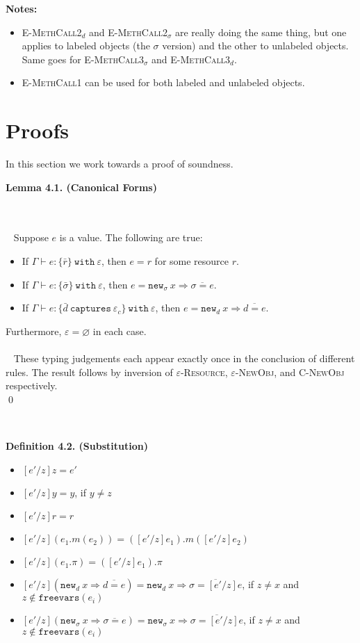 \documentclass{llncs}
\newcommand{\keywadj}[1]{\mathtt{#1}}
\newcommand{\keyw}[1]{\keywadj{#1}~}
\newcommand{\thm}[3]{
	\begin{large}
		\bf{#1}
	\end{large} \\\\
	\fbox{Statement.} ~ #2
	\fbox{Proof.}~ #3 \qed
}
\newcommand{\type}[2]{
	#1~\keyw{with} #2
}
\newcommand{\newd}[0]{
	\keywadj{new}_d~x \Rightarrow \overline{d = e}
}
\newcommand{\newsig}[0]{
	\keywadj{new}_\sigma~x \Rightarrow \overline{\sigma = e}
}
\begin{document}
\noindent \textbf{Notes:}
\begin{itemize}
	\item \textsc{E-MethCall2$_d$} and \textsc{E-MethCall2$_\sigma$} are really doing the same thing, but one applies to labeled objects (the $\sigma$ version) and the other to unlabeled objects. Same goes for \textsc{E-MethCall3$_\sigma$} and \textsc{E-MethCall3$_d$}.
	\item \textsc{E-MethCall1} can be used for both labeled and unlabeled objects.
\end{itemize}

\section{Proofs}

In this section we work towards a proof of soundness. \\

\thm{Lemma 4.1. (Canonical Forms)}
{Suppose $e$ is a value. The following are true:
	\begin{itemize}
	\item If $\Gamma \vdash e : \type{ \{ \bar r \} }{\varepsilon} $, then $e = r$ for some resource $r$.
	\item If $\Gamma \vdash e : \type{ \{ \bar \sigma \}}{\varepsilon}$, then $e = \newsig$.
	\item If $\Gamma \vdash e : \{ \bar d~\keyw{captures} \varepsilon_c \}~ \keyw{with} \varepsilon$, then $e = \keywadj{new}_{d}~x \Rightarrow \overline{ d = e }$.
	\end{itemize}
Furthermore, $\varepsilon = \varnothing$ in each case. \\\\
}
{ These typing judgements each appear exactly once in the conclusion of different rules. The result follows by inversion of \textsc{$\varepsilon$-Resource}, \textsc{$\varepsilon$-NewObj}, and \textsc{C-NewObj} respectively. \\
}

~
\noindent
\begin{large}
	\bf{Definition 4.2. (Substitution)}
\end{large}

\begin{itemize}
	\item $[e'/z]z = e'$
	\item $[e'/z]y = y$, if $y \neq z$
	\item $[e'/z]r = r$
	\item $[e'/z](e_1.m(e_2)) = ([e'/z]e_1).m([e'/z]e_2)$
	\item $[e'/z](e_1.\pi) = ([e'/z]e_1).\pi$
	\item $[e'/z](\newd) = \keywadj{new}_d~x \Rightarrow \overline{ \sigma = [e'/z]e }$, if $z \neq x$ and $z \notin \keywadj{freevars}(e_i)$
	\item $[e'/z](\newsig) = \keywadj{new}_\sigma~x \Rightarrow \overline{ \sigma = [e'/z]e }$, if $z \neq x$ and $z \notin \keywadj{freevars}(e_i)$
\end{itemize}
\end{document}
